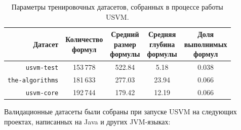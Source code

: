\begin{table}[ht]
\begin{center}
\begin{tabular}{r|cccc}
    Датасет & \makecell{Количество \\ формул} & \makecell{Средний \\ размер \\ формулы} & \makecell{Средняя \\ глубина \\ формулы} & \makecell{Доля \\ выполнимых \\ формул} \\
    \hline \hline
    \rule{0pt}{2.5ex}
    \texttt{usvm-test} & 153\,778 & 522.84 & 5.18 & 0.038 \\
    \texttt{the-algorithms} & 181\,633 & 277.03 & 23.94 & 0.066 \\
    \texttt{usvm-core} & 192\,744 & 179.42 & 12.19 & 0.066 \\
\end{tabular}
\caption{\label{usvm-train-datasets-table} Параметры тренировочных датасетов, собранных в процессе работы USVM.}
\end{center}
\end{table}

Валидационные датасеты были собраны при запуске USVM на следующих проектах, написанных на Java и других JVM-языках:

